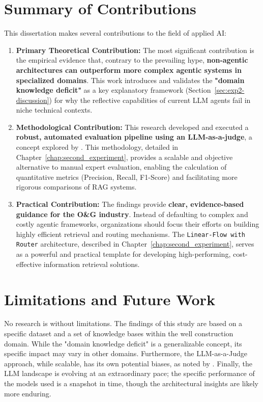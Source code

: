 \section{Summary of Contributions}
\label{sec:conclusion_contributions}

    This dissertation makes several contributions to the field of applied AI:

    \begin{enumerate}
        \item \textbf{Primary Theoretical Contribution:} The most significant contribution is the empirical evidence that, contrary to the prevailing hype, \textbf{non-agentic architectures can outperform more complex agentic systems in specialized domains}. This work introduces and validates the \textbf{"domain knowledge deficit"} as a key explanatory framework (Section~\ref{sec:exp2-discussion}) for why the reflective capabilities of current LLM agents fail in niche technical contexts.

        \item \textbf{Methodological Contribution:} This research developed and executed a \textbf{robust, automated evaluation pipeline using an LLM-as-a-judge}, a concept explored by \citet{Zheng2023}. This methodology, detailed in Chapter~\ref{chap:second_experiment}, provides a scalable and objective alternative to manual expert evaluation, enabling the calculation of quantitative metrics (Precision, Recall, F1-Score) and facilitating more rigorous comparisons of RAG systems.

        \item \textbf{Practical Contribution:} The findings provide \textbf{clear, evidence-based guidance for the O\&G industry}. Instead of defaulting to complex and costly agentic frameworks, organizations should focus their efforts on building highly efficient retrieval and routing mechanisms. The \texttt{Linear-Flow with Router} architecture, described in Chapter~\ref{chap:second_experiment}, serves as a powerful and practical template for developing high-performing, cost-effective information retrieval solutions.
    \end{enumerate}

\section{Limitations and Future Work}
\label{sec:conclusion_future_work}

    No research is without limitations. The findings of this study are based on a specific dataset and a set of knowledge bases within the well construction domain. While the "domain knowledge deficit" is a generalizable concept, its specific impact may vary in other domains. Furthermore, the LLM-as-a-Judge approach, while scalable, has its own potential biases, as noted by \citet{Gu2025}. Finally, the LLM landscape is evolving at an extraordinary pace; the specific performance of the models used is a snapshot in time, though the architectural insights are likely more enduring.

